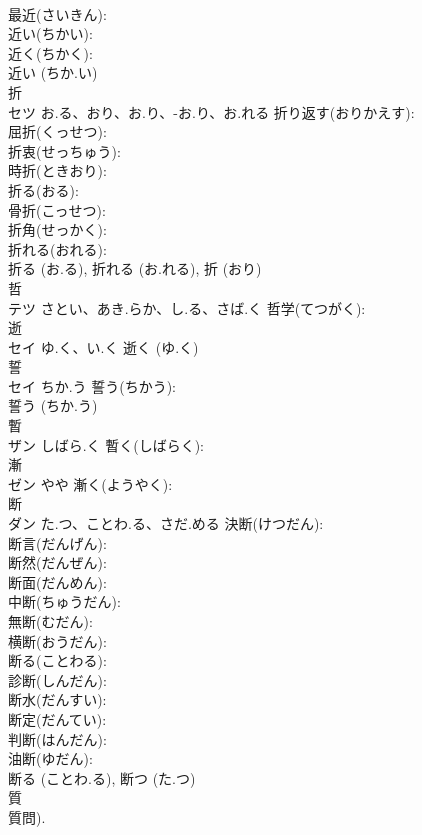 \documentclass[8pt]{extreport}
\begin{document}
\begin{CJK}{UTF8}{min}
\\	最近(さいきん): 
\\	近い(ちかい): 
\\	近く(ちかく): 
\\	近い (ちか.い)
\\	折			
\\	セツ	お.る、おり、お.り、-お.り、お.れる	折り返す(おりかえす): 
\\	屈折(くっせつ): 
\\	折衷(せっちゅう): 
\\	時折(ときおり): 
\\	折る(おる): 
\\	骨折(こっせつ): 
\\	折角(せっかく): 
\\	折れる(おれる): 
\\	折る (お.る), 折れる (お.れる), 折 (おり)
\\	哲			
\\	テツ	さとい、あき.らか、し.る、さば.く	哲学(てつがく): 
\\	逝			
\\	セイ	ゆ.く、い.く		逝く (ゆ.く)
\\	誓			
\\	セイ	ちか.う	誓う(ちかう): 
\\	誓う (ちか.う)
\\	暫			
\\	ザン	しばら.く	暫く(しばらく): 
\\	漸			
\\	ゼン	やや	漸く(ようやく): 
\\	断			
\\	ダン	た.つ、ことわ.る、さだ.める	決断(けつだん): 
\\	断言(だんげん): 
\\	断然(だんぜん): 
\\	断面(だんめん): 
\\	中断(ちゅうだん): 
\\	無断(むだん): 
\\	横断(おうだん): 
\\	断る(ことわる): 
\\	診断(しんだん): 
\\	断水(だんすい): 
\\	断定(だんてい): 
\\	判断(はんだん): 
\\	油断(ゆだん): 
\\	断る (ことわ.る), 断つ (た.つ)
\\	質			
\\	質問).	

\end{CJK}
\end{document}
